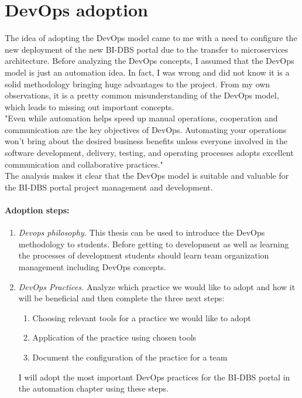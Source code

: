 \section{DevOps adoption} The idea of adopting the DevOps model came to me with a need to configure the new deployment of the new BI-DBS portal due to the transfer to microservices architecture. Before analyzing the DevOps concepts, I assumed that the DevOps model is just an automation idea. In fact, I was wrong and did not know it is a solid methodology bringing huge advantages to the project. From my own observations, it is a pretty common misunderstanding of the DevOps model, which leads to missing out important concepts.\\ 

\noindent "Even while automation helps speed up manual operations, cooperation and communication are the key objectives of DevOps. Automating your operations won’t bring about the desired business benefits unless everyone involved in the software development, delivery, testing, and operating processes adopts excellent communication and collaborative practices." \cite{devops-adoption}\\
The analysis makes it clear that the DevOps model is suitable and valuable for the BI-DBS portal project management and development.

\paragraph*{Adoption steps:} 


\begin{enumerate}
    \item \emph{Devops philosophy.} This thesis can be used to introduce the DevOps methodology to students. Before getting to development as well as learning the processes of development students should learn team organization management including DevOps concepts. 
    \item \emph{DevOps Practices.} Analyze which practice we would like to adopt and how it will be beneficial and then complete the three next steps:
        \begin{enumerate}
            \item Choosing relevant tools for a practice we would like to adopt
            \item Application of the practice using chosen tools
            \item Document the configuration of the practice for a team
        \end{enumerate}
    I will adopt the most important DevOps practices for the BI-DBS portal in the automation chapter using these steps.
\end{enumerate}


